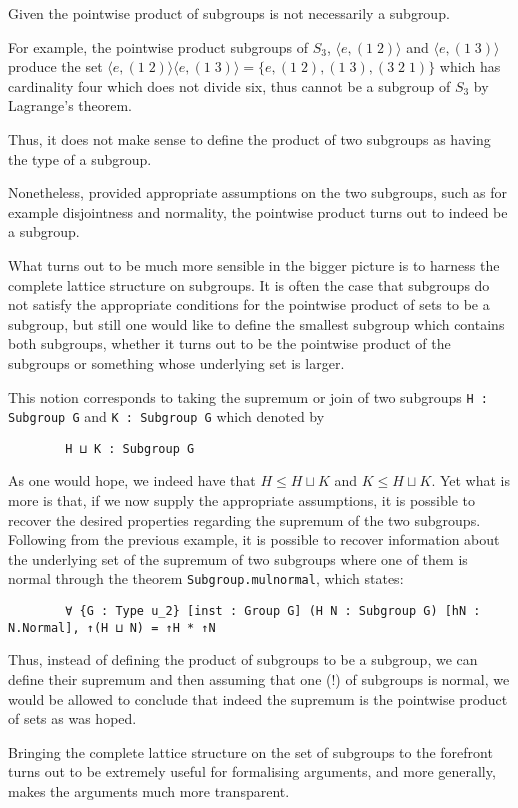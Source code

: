 \begin{remark}
    Given the pointwise product of subgroups is not necessarily a subgroup. 

    For example, the pointwise product subgroups of $S_3$, $\langle e, (1\;2) \rangle$ and $\langle e, (1\;3) \rangle$ produce the set 
    $\langle e, (1\;2) \rangle \langle e, (1\;3) \rangle =\{e, (1\;2), (1\;3), (3\;2\;1)\}$ which has cardinality four which does not divide six,
    thus cannot be a subgroup of $S_3$ by Lagrange's theorem.

    Thus, it does not make sense to define the product of two subgroups as having the type of a subgroup.

    Nonetheless, provided appropriate assumptions on the two subgroups, such as for example disjointness and normality, the pointwise product turns out to indeed be a subgroup.
    
    What turns out to be much more sensible in the bigger picture is to harness the complete lattice structure on subgroups. It is often the case that
    subgroups do not satisfy the appropriate conditions for the pointwise product of sets to be a subgroup, but still one would like to define the smallest subgroup which contains both subgroups,
    whether it turns out to be the pointwise product of the subgroups or something whose underlying set is larger.

    This notion corresponds to taking the supremum or join of two subgroups \texttt{H : Subgroup G} and \texttt{K : Subgroup G} which denoted by 

    \begin{verbatim}
        H ⊔ K : Subgroup G
    \end{verbatim}

    As one would hope, we indeed have that $H \le H \sqcup K$ and $K \le H \sqcup K$.
    Yet what is more is that, if we now supply the appropriate assumptions, it is
    possible to recover the desired properties regarding the supremum of the two subgroups. Following from the previous example,
    it is possible to recover information about the underlying set of the supremum of two subgroups where one of them is normal 
    through the theorem \texttt{Subgroup.mul\textunderscore normal}, which states:
    
    \begin{verbatim}
        ∀ {G : Type u_2} [inst : Group G] (H N : Subgroup G) [hN : N.Normal], ↑(H ⊔ N) = ↑H * ↑N
    \end{verbatim}
    
    Thus, instead of defining the product of subgroups to be a subgroup, we can define their supremum and then
    assuming that one (!) of subgroups is normal, we would be allowed to conclude that indeed the supremum
    is the pointwise product of sets as was hoped.
    
    Bringing the complete lattice structure on the set of subgroups to the forefront turns out to be extremely useful for formalising arguments,
    and more generally, makes the arguments much more transparent.
\end{remark}

